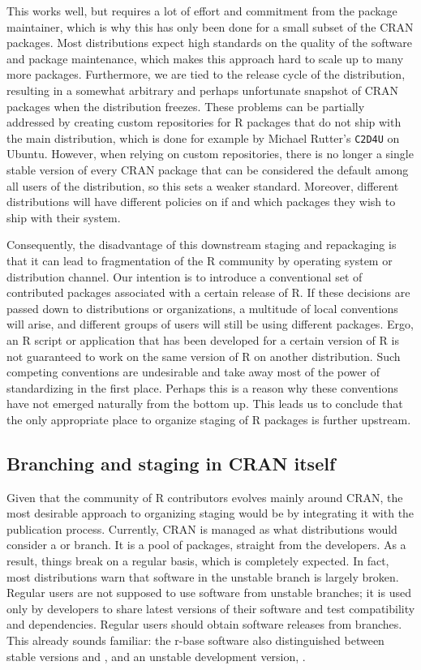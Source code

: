 This works well, but requires a lot of effort and commitment from the package
maintainer, which is why this has only been done for a small subset of the CRAN
packages. Most distributions expect high standards on the quality of the
software and package maintenance, which makes this approach hard to scale up to
many more packages. Furthermore, we are tied to the release cycle of the
distribution, resulting in a somewhat arbitrary and perhaps unfortunate
snapshot of CRAN packages when the distribution freezes. These problems can be
partially addressed by creating custom repositories for R packages that do not
ship with the main distribution, which is done for example by Michael Rutter's
\texttt{C2D4U} on Ubuntu. However, when relying on custom repositories, there is no longer
a single stable version of every CRAN package that can be considered the
default among all users of the distribution, so this sets a weaker standard. 
Moreover, different distributions will have different policies on if and which
packages they wish to ship with their system.

Consequently, the disadvantage of this downstream staging and repackaging is that it
can lead to fragmentation of the R community by operating system or distribution
channel. Our intention is to introduce a conventional set of contributed packages
associated with a certain release of R. If these decisions are passed down to
distributions or organizations, a multitude of local conventions will arise, and
different groups of users will still be using different packages. Ergo, an R script
or application that has been developed for a certain version of R is not guaranteed
to work on the same version of R on another distribution. Such competing conventions
are undesirable and take away most of the power of standardizing in the first place.
Perhaps this is a reason why these conventions have not emerged naturally from the
bottom up. This leads us to conclude that the only appropriate place to organize
staging of R packages is further upstream.

\subsection{Branching and staging in CRAN itself}

Given that the community of R contributors evolves mainly around CRAN, the most
desirable approach to organizing staging would be by integrating it with the 
publication process. Currently, CRAN is managed as what
distributions would consider a  or  branch.
It is a pool of  packages, straight from the developers. As
a result, things break on a regular basis, which is completely expected. In
fact, most distributions warn that software in the unstable branch is largely
broken. Regular users are not supposed to use software from unstable branches;
it is used only by developers to share latest versions of their software and
test compatibility and dependencies. Regular users should obtain software
releases from  branches. This already sounds familiar: 
the r-base software also distinguished between stable versions 
 and , and an unstable development version, .

